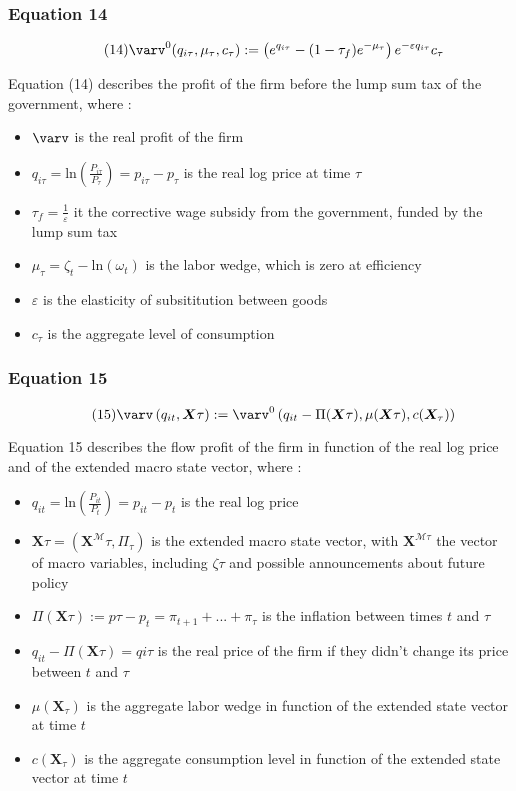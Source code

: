 \documentclass{article}
\begin{document}
\subsubsection*{Equation 14}
\begin{equation}\tag{14}
    \varv^{0}(q_{i\tau},\mu_{\tau},c_{\tau}):=\left(e^{q_{i\tau}}-(1-\tau_{f})e^{-\mu_{\tau}}\right)e^{-\varepsilon q_{i\tau}}c_{\tau}
\end{equation}

Equation (14) describes the profit of the firm before the lump sum tax of the government, where : 
\begin{itemize}
    \item $\varv$ is the real profit of the firm
    \item $q_{i\tau}=\text{ln}\left(\frac{P_{i\tau}}{P_{\tau}}\right)=p_{i\tau}-p_{\tau}$ is the real log price at time $\tau$
    \item $\tau_f=\frac{1}{\varepsilon}$ it the corrective wage subsidy from the government, funded by the lump sum tax
    \item $\mu_{\tau}=\zeta_{t}-\text{ln}(\omega_{t})$ is the labor wedge, which is zero at efficiency
    \item $\varepsilon$ is the elasticity of subsititution between goods
    \item $c_{\tau}$ is the aggregate level of consumption
\end{itemize}

\subsubsection*{Equation 15}
\begin{equation}\tag{15}
    \varv\left(q_{it},\bm{X}{\tau}\right):=\varv^{0}\left(q_{it}-\Pi(\bm{X}{\tau}),\mu(\bm{X}{\tau}),c(\bm{X}_{\tau})\right)
\end{equation}

Equation 15 describes the flow profit of the firm in function of the real log price and of the extended macro state vector, where : 
\begin{itemize}
    \item $q_{it}=\text{ln}\left(\frac{P_{it}}{P_{t}}\right)=p_{it}-p_{t}$ is the real log price
    \item $\bm{X}{\tau}=(\bm{X}^{\mathcal{M}}{\tau}, \Pi_{\tau})$ is the extended macro state vector, with $\bm{X}^{\mathcal{M}{\tau}}$ the vector of macro variables, including $\zeta{\tau}$ and possible announcements about future policy
    \item $\Pi\left(\bm{X}{\tau}\right):=p{\tau}-p_{t}=\pi_{t+1}+...+\pi_{\tau}$ is the inflation between times $t$ and $\tau$
    \item $q_{it}-\Pi(\bm{X}{\tau})=q{i\tau}$ is the real price of the firm if they didn't change its price between $t$ and $\tau$
    \item $\mu\left(\bm{X}_{\tau}\right)$ is the aggregate labor wedge in function of the extended state vector at time $t$
    \item $c(\bm{X}_{\tau})$ is the aggregate consumption level in function of the extended state vector at time $t$
\end{itemize}
\end{document}
